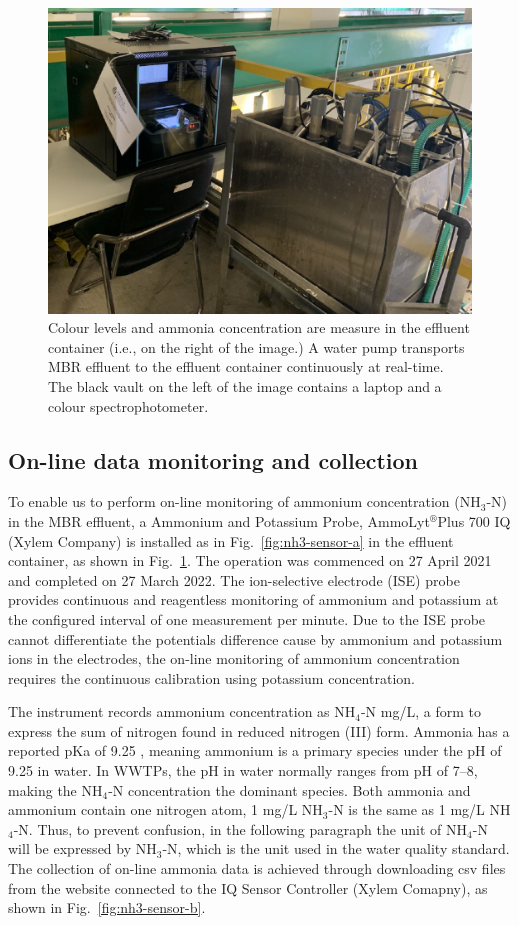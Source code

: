 \begin{figure}[h]
    \centering
    \includegraphics[width=0.8\columnwidth]{imgs/instrument/sampling-tank.png}
    \caption{Colour levels and ammonia concentration are measure in the effluent container (i.e., on the right of the image.) A water pump transports MBR effluent to the effluent container continuously at real-time. The black vault on the left of the image contains a laptop and a colour spectrophotometer.} 
    \label{fig:sampling-tank}
 \end{figure}

\subsection{On-line data monitoring and collection}
To enable us to perform on-line monitoring of ammonium concentration (NH$_{3}$-N) in the MBR effluent, a Ammonium and Potassium Probe, AmmoLyt$^\circledR$Plus 700 IQ (Xylem Company) is installed as in Fig.~\ref{fig:nh3-sensor-a} in the effluent container, as shown in Fig.~\ref{fig:sampling-tank}. The operation was commenced on 27 April 2021 and completed on 27 March 2022. The ion-selective electrode (ISE) probe provides continuous and reagentless monitoring of ammonium and potassium at the configured interval of one measurement per minute. Due to the ISE probe cannot differentiate the potentials difference cause by ammonium and potassium ions in the electrodes, the on-line monitoring of ammonium concentration requires the continuous calibration using potassium concentration.

The instrument records ammonium concentration as NH$_{4}$-N mg/L, a form to express the sum of nitrogen found in reduced nitrogen (III) form. Ammonia has a reported pKa of 9.25 \citep{nationalcenterforbiotechnologyinformationPubChemCompoundSummary2022}, meaning ammonium is a primary species under the pH of 9.25 in water. In WWTPs, the pH in water normally ranges from pH of 7--8, making the NH$_{4}$-N concentration the dominant species. Both ammonia and ammonium contain one nitrogen atom, 1 mg/L NH$_{3}$-N is the same as 1 mg/L NH$_{4}$-N. Thus, to prevent confusion, in the following paragraph the unit of NH$_{4}$-N will be expressed by NH$_{3}$-N, which is the unit used in the water quality standard. The collection of on-line ammonia data is achieved through downloading csv files from the website connected to the IQ Sensor Controller (Xylem Comapny), as shown in Fig.~\ref{fig:nh3-sensor-b}. 

